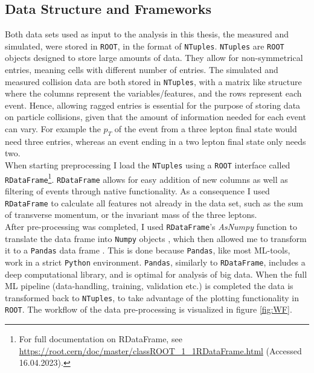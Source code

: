 \subsection{Data Structure and Frameworks}
Both data sets used as input to the analysis in this thesis, the measured and simulated, were stored in \verb!ROOT!, in the format of \verb!NTuples!. 
\verb!NTuples! are \verb!ROOT! objects designed to store large amounts of data. They allow for non-symmetrical entries, meaning 
cells with different number of entries. The simulated and measured collision data are both stored in \verb!NTuples!, with a matrix like structure 
where the columns represent the variables/features, and the rows represent each event. Hence, allowing ragged entries is essential 
for the purpose of storing data on particle collisions, given that the amount of information needed for each event can vary. For example the $p_T$ of the 
event from a three lepton final state would need three entries, whereas an event ending in a two lepton final state only needs two.
\\
When starting preprocessing I load the \verb!NTuples! using a \verb!ROOT! interface called \verb!RDataFrame!\footnote{For full 
documentation on RDataFrame, see \url{https://root.cern/doc/master/classROOT\_1\_1RDataFrame.html} 
(Accessed 16.04.2023).}. \verb!RDataFrame! allows for easy addition of new columns as well as filtering of events through native functionality. 
As a consequence I used \verb!RDataFrame! to calculate all features not already in the data set, such as the sum of transverse momentum, 
or the invariant mass of the three leptons. 
\\
After pre-processing was completed, I used \verb!RDataFrame!'s \emph{AsNumpy} function to translate the data frame into 
\verb!Numpy! objects \cite{numpy}, which then allowed me to transform it to a \verb!Pandas! data frame \cite{Pandas}. This is done
because \verb!Pandas!, like most \ac{ML}-tools, work in a strict \verb!Python! environment. \verb!Pandas!, similarly to \verb!RDataFrame!,
includes a deep computational library, and is optimal for analysis of big data. When the full \ac{ML} 
pipeline (data-handling, training, validation etc.) is completed the data is transformed back to \verb!NTuples!, 
to take advantage of the plotting functionality in \verb!ROOT!. The workflow of the data pre-processing is visualized in figure 
\ref{fig:WF}.
